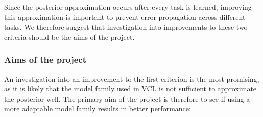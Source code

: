 \documentclass[a4paper,11=0pt]{article}
\begin{document}
Since the posterior approximation occurs after every task is learned, improving this approximation is important to prevent error propagation across different tasks. We therefore suggest that investigation into improvements to these two criteria should be the aims of the project.

\vspace{-1em}
\subsubsection*{Aims of the project}

\vspace{-1em}
An investigation into an improvement to the first criterion is the most promising, as it is likely that the model family used in VCL is not sufficient to approximate the posterior well. The primary aim of the project is therefore to see if using a more adaptable model family results in better performance:
\end{document}
